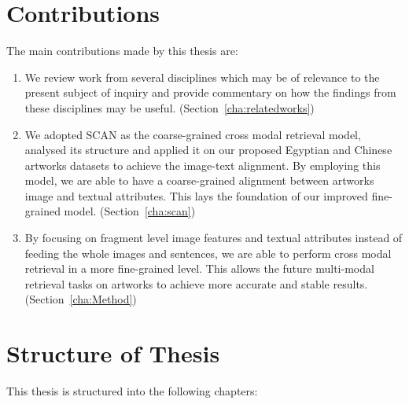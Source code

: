 \section{Contributions}
The main contributions made by this thesis are:

\begin{enumerate}
    \item We review work from several disciplines which may be of relevance to the present subject of inquiry and provide commentary on how the findings from these disciplines may be useful. (Section~\ref{cha:relatedworks})
    \item We adopted SCAN \cite{scan} as the coarse-grained cross modal retrieval model, analysed its structure and applied it on our proposed Egyptian and Chinese artworks datasets to achieve the image-text alignment. By employing this model, we are able to have a coarse-grained alignment between artworks image and textual attributes. This lays the foundation of our improved fine-grained model. (Section~\ref{cha:scan})
    \item By focusing on fragment level image features and textual attributes instead of feeding the whole images and sentences, we are able to perform cross modal retrieval in a more fine-grained level. This allows the future multi-modal retrieval tasks on artworks to achieve more accurate and stable results. (Section~\ref{cha:Method})
\end{enumerate}


\section{Structure of Thesis}

This thesis is structured into the following chapters:

